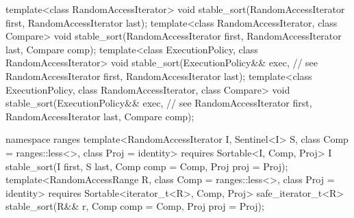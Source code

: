 \begin{codeblock}
  template<class RandomAccessIterator>
    void stable_sort(RandomAccessIterator first, RandomAccessIterator last);
  template<class RandomAccessIterator, class Compare>
    void stable_sort(RandomAccessIterator first, RandomAccessIterator last,
                     Compare comp);
  template<class ExecutionPolicy, class RandomAccessIterator>
    void stable_sort(ExecutionPolicy&& exec, // see 
                     RandomAccessIterator first, RandomAccessIterator last);
  template<class ExecutionPolicy, class RandomAccessIterator, class Compare>
    void stable_sort(ExecutionPolicy&& exec, // see 
                     RandomAccessIterator first, RandomAccessIterator last,
                     Compare comp);
\end{codeblock}\begin{addedblock}\begin{codeblock}
  namespace ranges {
    template<RandomAccessIterator I, Sentinel<I> S, class Comp = ranges::less<>,
        class Proj = identity>
      requires Sortable<I, Comp, Proj>
      I stable_sort(I first, S last, Comp comp = Comp{}, Proj proj = Proj{});
    template<RandomAccessRange R, class Comp = ranges::less<>, class Proj = identity>
      requires Sortable<iterator_t<R>, Comp, Proj>
      safe_iterator_t<R>
        stable_sort(R&& r, Comp comp = Comp{}, Proj proj = Proj{});
  }
\end{codeblock}\end{addedblock}\begin{codeblock}


\end{codeblock}
